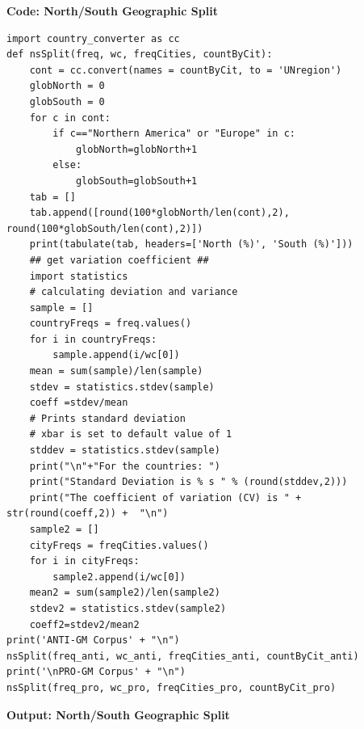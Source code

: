 \textbf{Code: North/South Geographic Split}

\begin{lstlisting}
import country_converter as cc
def nsSplit(freq, wc, freqCities, countByCit):
    cont = cc.convert(names = countByCit, to = 'UNregion')
    globNorth = 0
    globSouth = 0
    for c in cont:
        if c=="Northern America" or "Europe" in c:
            globNorth=globNorth+1
        else:
            globSouth=globSouth+1
    tab = []
    tab.append([round(100*globNorth/len(cont),2), round(100*globSouth/len(cont),2)])
    print(tabulate(tab, headers=['North (%)', 'South (%)']))
    ## get variation coefficient ##
    import statistics 
    # calculating deviation and variance
    sample = [] 
    countryFreqs = freq.values()
    for i in countryFreqs:
        sample.append(i/wc[0])
    mean = sum(sample)/len(sample)
    stdev = statistics.stdev(sample)
    coeff =stdev/mean
    # Prints standard deviation 
    # xbar is set to default value of 1 
    stddev = statistics.stdev(sample)
    print("\n"+"For the countries: ")
    print("Standard Deviation is % s " % (round(stddev,2))) 
    print("The coefficient of variation (CV) is " +  str(round(coeff,2)) +  "\n") 
    sample2 = [] 
    cityFreqs = freqCities.values()
    for i in cityFreqs:
        sample2.append(i/wc[0])
    mean2 = sum(sample2)/len(sample2)
    stdev2 = statistics.stdev(sample2)
    coeff2=stdev2/mean2
print('ANTI-GM Corpus' + "\n")       
nsSplit(freq_anti, wc_anti, freqCities_anti, countByCit_anti)
print('\nPRO-GM Corpus' + "\n")       
nsSplit(freq_pro, wc_pro, freqCities_pro, countByCit_pro)
\end{lstlisting}

\textbf{Output: North/South Geographic Split}

